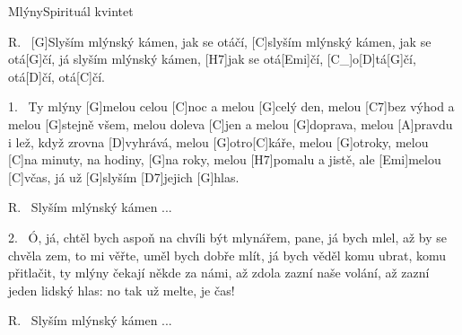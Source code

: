\begin{song}{Mlýny}{Spirituál kvintet}

\begin{xverse}{R.~}
[G]Slyším mlýnský kámen, jak se otáčí,
[C]slyším mlýnský kámen, jak se otá[G]{čí},
já slyším mlýnský kámen, [H7]jak se otá[Emi]{čí},
[C_]o[D]tá[G]{čí}, otá[D]{čí}, otá[C]{čí}.
\end{xverse}

\begin{xverse}{1.~}
Ty mlýny [G]melou celou [C]noc a melou [G]celý den,
melou [C7]bez výhod a melou [G]stejně všem,
melou doleva [C]jen a melou [G]doprava,
melou [A]pravdu i lež, když zrovna [D]vyhrává,
melou [G]otro[C]káře, melou [G]otroky,
melou [C]na minuty, na hodiny, [G]na roky,
melou [H7]pomalu a jistě, ale [Emi]melou [C]včas,
já už [G]slyším [D7]jejich [G]hlas.
\end{xverse}

\begin{xverse}{R.~}
Slyším mlýnský kámen ...
\end{xverse}

\begin{xverse}{2.~}
Ó, já, chtěl bych aspoň na chvíli být mlynářem,
pane, já bych mlel, až by se chvěla zem,
to mi věřte, uměl bych dobře mlít,
já bych věděl komu ubrat, komu přitlačit,
ty mlýny čekají někde za námi, až zdola zazní naše volání,
až zazní jeden lidský hlas: no tak už melte, je čas!
\end{xverse}

\begin{xverse}{R.~}
Slyším mlýnský kámen ...
\end{xverse}

\end{song}

